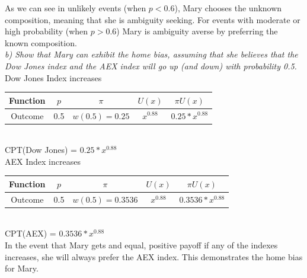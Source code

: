 \documentclass{article}
\begin{document}
As we can see in unlikely events (when $p<0.6$), Mary chooses the unknown composition, meaning that she is ambiguity seeking. For events with moderate or high probability (when $p>0.6$) Mary is ambiguity averse by preferring the known composition.\\
 

\textit{b) Show that Mary can exhibit the home bias, assuming that she believes that the Dow Jones index and the AEX index will go up (and down) with probability 0.5.}\\

Dow Jones Index increases\\

\begin{tabular}{|c|c|c|c|c|} \hline
	Function	&$p$	&$\pi$	&$U(x)$	&$\pi U(x)$\\ \hline
	Outcome	&0.5 	&$w(0.5)=0.25$	&$x^{0.88}$	&$0.25*x^{0.88}$\\ \hline 		
\end{tabular}\\

CPT(Dow Jones) = $0.25*x^{0.88}$\\

AEX Index increases\\

\begin{tabular}{|c|c|c|c|c|} \hline
	Function	&$p$	&$\pi$	&$U(x)$	&$\pi U(x)$\\ \hline
	Outcome	&0.5 	&$w(0.5)=0.3536$	&$x^{0.88}$	&$0.3536*x^{0.88}$\\ \hline 		
\end{tabular}\\

CPT(AEX) = $0.3536*x^{0.88}$\\

In the event that Mary gets and equal, positive payoff if any of the indexes increases, she will always prefer the AEX index. This demonstrates the home bias for Mary. 
\end{document}
